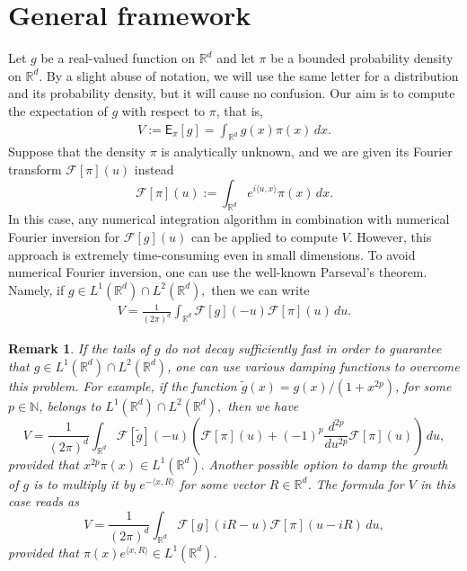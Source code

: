 \documentclass[preprint, 3p, authoryear]{elsarticle}
\newcommand{\E}{\mathsf{E}}
\newcommand{\N}{\mathbb N}
\newtheorem{remark}{Remark}
\theoremstyle{definition}
\begin{document}
\section{General framework}
\label{general}
Let \(g\) be a real-valued function on \(\mathbb{R}^d\) and let \(\pi\) be a bounded probability density
on \(\mathbb{R}^d\). 
By a slight abuse of notation, we will use the same letter for a distribution and its probability density, but it will cause no confusion.
Our aim is to compute the expectation of \(g\) with respect to \(\pi\), that is,
\begin{eqnarray*}
V:=\E_{\pi}[g]=\int_{\mathbb{R}^d} g(x)\pi(x)\,dx.
\end{eqnarray*}
Suppose that the density  $\pi$ is analytically unknown, and we are given its Fourier transform $\mathcal{F}[\pi](u)$ instead
\[
	\mathcal{F}[\pi](u) := \int_{\mathbb{R}^d} e^{{i} \langle u,x \rangle} \pi(x) \, dx.
\]
In this case, any numerical integration algorithm in combination with 
numerical Fourier inversion for $\mathcal{F}[g](u)$ can be applied to compute $V$.
However, this approach is extremely time-consuming even in small dimensions. 
To avoid numerical Fourier inversion, one can use the well-known Parseval's theorem.
Namely, if $g \in L^1(\mathbb{R}^d)\cap L^2(\mathbb{R}^d),$
then we can write
\begin{eqnarray*}
\label{value_parseval_simple}
V=\frac{1}{{{(2\pi)^d}}}\int_{\mathbb{R}^d}\mathcal{F}[g](-u)\mathcal{F}[\pi](u)\, du.
\end{eqnarray*}
\begin{remark}
If the tails of $g$ do not decay sufficiently fast in order to guarantee that $g \in L^1(\mathbb{R}^d)\cap L^2(\mathbb{R}^d)$, one can 
use various damping functions to overcome this problem. For example, if the function $\widetilde g(x)=g(x)/(1+x^{2p})$, for some $p\in\N$, belongs to \( L^1(\mathbb{R}^d)\cap L^2(\mathbb{R}^d),\) then we have
\begin{equation*}
\label{value_parseval1}
V=\frac{1}{{{(2\pi)^d}}}\int_{\mathbb{R}^d}\mathcal{F}[\widetilde g](-u)\left(\mathcal{F}[\pi](u)+(-1)^p\frac{d^{2p}}{du^{2p}}\mathcal{F}[\pi](u)\right)\, du,
\end{equation*}
provided that \(x^{2p}\pi(x)\in L^1(\mathbb{R}^d).\)
Another possible option to damp the growth of $g$ is to multiply it by $e^{-\langle x,R \rangle}$ for some vector $R\in \mathbb{R}^d$.
The formula for $V$ in this case reads as
\begin{equation*}
\label{value_parseval2}
V=\frac{1}{{{(2\pi)^d}}}\int_{\mathbb{R}^d}\mathcal{F}[g]({i}R-u)\mathcal{F}[\pi](u-{i}R)\, du,
\end{equation*}
provided that $\pi(x)e^{\langle x,R \rangle}\in L^1(\mathbb{R}^d)$.
\end{remark}
\end{document}
